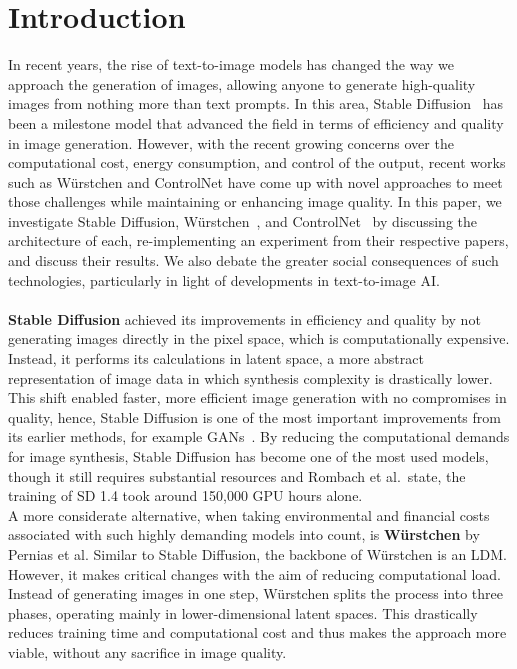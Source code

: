 \section{Introduction}
In recent years, the rise of text-to-image models has changed the way we approach the generation of images, allowing anyone to generate high-quality images from nothing more than text prompts. In this area, Stable Diffusion~\cite{rombach2022stablediffusion} has been a milestone model that advanced the field in terms of efficiency and quality in image generation. However, with the recent growing concerns over the computational cost, energy consumption, and control of the output, recent works such as Würstchen and ControlNet have come up with novel approaches to meet those challenges while maintaining or enhancing image quality. In this paper, we investigate Stable Diffusion, Würstchen~\cite{pernias2024wrstchen}, and ControlNet~\cite{zhang2023addingconditionalcontroltexttoimage} by discussing the architecture of each, re-implementing an experiment from their respective papers, and discuss their results. We also debate the greater social consequences of such technologies, particularly in light of developments in text-to-image AI.
\\
\\
\noindent
\textbf{Stable Diffusion} achieved its improvements in efficiency and quality by not generating images directly in the pixel space, which is computationally expensive. Instead, it performs its calculations in latent space, a more abstract representation of image data in which synthesis complexity is drastically lower. This shift enabled faster, more efficient image generation with no compromises in quality, hence, Stable Diffusion is one of the most important improvements from its earlier methods, for example GANs~\cite{DBLP:journals/corr/abs-2105-05233}. By reducing the computational demands for image synthesis, Stable Diffusion has become one of the most used models, though it still requires substantial resources and Rombach et al.\ state, the training of SD 1.4 took around 150,000 GPU hours alone.
\\
\noindent
A more considerate alternative, when taking environmental and financial costs associated with such highly demanding models into count, is \textbf{Würstchen} by Pernias et al. Similar to Stable Diffusion, the backbone of Würstchen is an LDM. However, it makes critical changes with the aim of reducing computational load. Instead of generating images in one step, Würstchen splits the process into three phases, operating mainly in lower-dimensional latent spaces. This drastically reduces training time and computational cost and thus makes the approach more viable, without any sacrifice in image quality.
